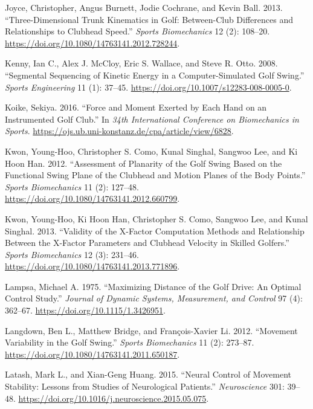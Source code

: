 \documentclass[
  letterpaper,
]{report}
\newlength{\cslhangindent}
\newenvironment{CSLReferences}[2] %
 {\begin{list}{}{%
  \setlength{\itemindent}{0pt}
  \setlength{\leftmargin}{0pt}
  \setlength{\parsep}{0pt}
  \ifodd #1
   \setlength{\leftmargin}{\cslhangindent}
   \setlength{\itemindent}{-1\cslhangindent}
  \fi
  \setlength{\itemsep}{#2\baselineskip}}}
 {\end{list}}
\begin{document}
\begin{CSLReferences}{1}{0}
Joyce, Christopher, Angus Burnett, Jodie Cochrane, and Kevin Ball. 2013.
{``Three-Dimensional Trunk Kinematics in Golf: Between-Club Differences
and Relationships to Clubhead Speed.''} \emph{Sports Biomechanics} 12
(2): 108--20. \url{https://doi.org/10.1080/14763141.2012.728244}.

Kenny, Ian C., Alex J. McCloy, Eric S. Wallace, and Steve R. Otto. 2008.
{``Segmental Sequencing of Kinetic Energy in a Computer-Simulated Golf
Swing.''} \emph{Sports Engineering} 11 (1): 37--45.
\url{https://doi.org/10.1007/s12283-008-0005-0}.

Koike, Sekiya. 2016. {``Force and Moment Exerted by Each Hand on an
Instrumented Golf Club.''} In \emph{34th International Conference on
Biomechanics in Sports}.
\url{https://ojs.ub.uni-konstanz.de/cpa/article/view/6828}.

Kwon, Young-Hoo, Christopher S. Como, Kunal Singhal, Sangwoo Lee, and Ki
Hoon Han. 2012. {``Assessment of Planarity of the Golf Swing Based on
the Functional Swing Plane of the Clubhead and Motion Planes of the Body
Points.''} \emph{Sports Biomechanics} 11 (2): 127--48.
\url{https://doi.org/10.1080/14763141.2012.660799}.

Kwon, Young-Hoo, Ki Hoon Han, Christopher S. Como, Sangwoo Lee, and
Kunal Singhal. 2013. {``Validity of the {X}-Factor Computation Methods
and Relationship Between the {X}-Factor Parameters and Clubhead Velocity
in Skilled Golfers.''} \emph{Sports Biomechanics} 12 (3): 231--46.
\url{https://doi.org/10.1080/14763141.2013.771896}.

Lampsa, Michael A. 1975. {``Maximizing Distance of the Golf Drive: An
Optimal Control Study.''} \emph{Journal of Dynamic Systems, Measurement,
and Control} 97 (4): 362--67. \url{https://doi.org/10.1115/1.3426951}.

Langdown, Ben L., Matthew Bridge, and François-Xavier Li. 2012.
{``Movement Variability in the Golf Swing.''} \emph{Sports Biomechanics}
11 (2): 273--87. \url{https://doi.org/10.1080/14763141.2011.650187}.

Latash, Mark L., and Xian-Geng Huang. 2015. {``Neural Control of
Movement Stability: Lessons from Studies of Neurological Patients.''}
\emph{Neuroscience} 301: 39--48.
\url{https://doi.org/10.1016/j.neuroscience.2015.05.075}.


\end{CSLReferences}
\end{document}
